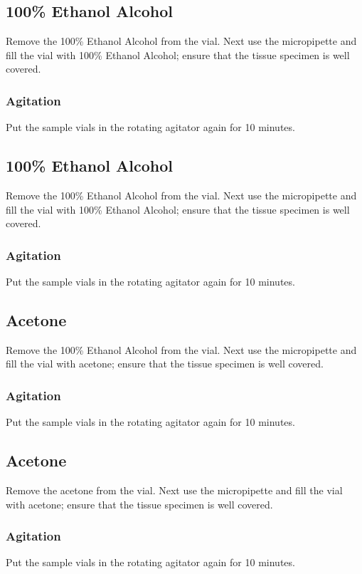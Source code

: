 \subsection{100\% Ethanol Alcohol}
Remove the 100\% Ethanol Alcohol from the vial.  Next use the micropipette and
fill the vial with 100\% Ethanol Alcohol; ensure that the tissue specimen is
well covered.

\subsubsection{Agitation}
Put the sample vials in the rotating agitator again for 10 minutes. 

\subsection{100\% Ethanol Alcohol}
Remove the 100\% Ethanol Alcohol from the vial.  Next use the micropipette and
fill the vial with 100\% Ethanol Alcohol; ensure that the tissue specimen is
well covered.

\subsubsection{Agitation}
Put the sample vials in the rotating agitator again for 10 minutes. 

\subsection{Acetone}
Remove the 100\% Ethanol Alcohol from the vial.  Next use the micropipette and
fill the vial with acetone; ensure that the tissue specimen is well covered.

\subsubsection{Agitation}
Put the sample vials in the rotating agitator again for 10 minutes. 

\subsection{Acetone}
Remove the acetone from the vial.  Next use the micropipette and fill the vial
with acetone; ensure that the tissue specimen is well covered.

\subsubsection{Agitation}
Put the sample vials in the rotating agitator again for 10 minutes. 

